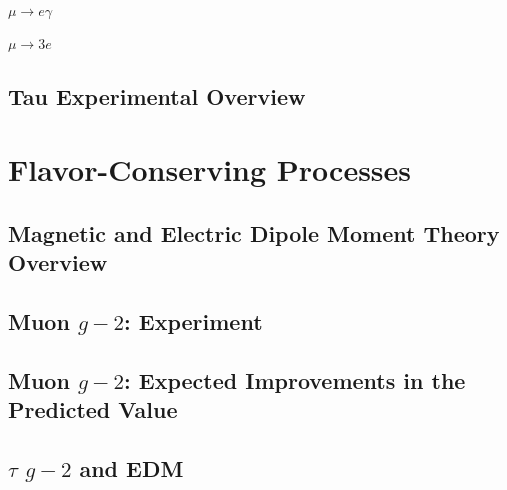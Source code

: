\paragraph{$\mu \to e \gamma$}


\paragraph{$\mu \to 3e$}



\subsection{Tau Experimental Overview}\label{sec:cl:tauexp}

%


\section{Flavor-Conserving Processes}\label{sec:cl:fcp}

\subsection{Magnetic and Electric Dipole Moment Theory Overview}\label{sec:cl:fct}


\subsection{Muon $g-2$:  Experiment}


\subsection{Muon $g-2$:  Expected Improvements in the Predicted Value}


\subsection{$\tau$ $g-2$ and EDM}


